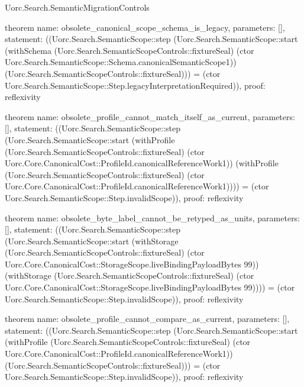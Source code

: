 \begin{lexlean}{Uorc.Search.SemanticMigrationControls}
\begin{semanticmodule}
theorem{
  name: obsolete_canonical_scope_schema_is_legacy,
  parameters: [],
  statement: ((Uorc.Search.SemanticScope::step (Uorc.Search.SemanticScope::start (withSchema (Uorc.Search.SemanticScopeControls::fixtureSeal) (ctor Uorc.Search.SemanticScope::Schema.canonicalSemanticScope1)) (Uorc.Search.SemanticScopeControls::fixtureSeal))) = (ctor Uorc.Search.SemanticScope::Step.legacyInterpretationRequired)),
  proof: reflexivity{}
}

theorem{
  name: obsolete_profile_cannot_match_itself_as_current,
  parameters: [],
  statement: ((Uorc.Search.SemanticScope::step (Uorc.Search.SemanticScope::start (withProfile (Uorc.Search.SemanticScopeControls::fixtureSeal) (ctor Uorc.Core.CanonicalCost::ProfileId.canonicalReferenceWork1)) (withProfile (Uorc.Search.SemanticScopeControls::fixtureSeal) (ctor Uorc.Core.CanonicalCost::ProfileId.canonicalReferenceWork1)))) = (ctor Uorc.Search.SemanticScope::Step.invalidScope)),
  proof: reflexivity{}
}

theorem{
  name: obsolete_byte_label_cannot_be_retyped_as_units,
  parameters: [],
  statement: ((Uorc.Search.SemanticScope::step (Uorc.Search.SemanticScope::start (withStorage (Uorc.Search.SemanticScopeControls::fixtureSeal) (ctor Uorc.Core.CanonicalCost::StorageScope.liveBindingPayloadBytes 99)) (withStorage (Uorc.Search.SemanticScopeControls::fixtureSeal) (ctor Uorc.Core.CanonicalCost::StorageScope.liveBindingPayloadBytes 99)))) = (ctor Uorc.Search.SemanticScope::Step.invalidScope)),
  proof: reflexivity{}
}

theorem{
  name: obsolete_profile_cannot_compare_as_current,
  parameters: [],
  statement: ((Uorc.Search.SemanticScope::step (Uorc.Search.SemanticScope::start (withProfile (Uorc.Search.SemanticScopeControls::fixtureSeal) (ctor Uorc.Core.CanonicalCost::ProfileId.canonicalReferenceWork1)) (Uorc.Search.SemanticScopeControls::fixtureSeal))) = (ctor Uorc.Search.SemanticScope::Step.invalidScope)),
  proof: reflexivity{}
}


\end{semanticmodule}
\end{lexlean}
